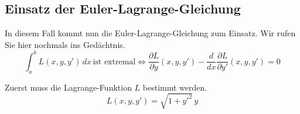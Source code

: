 \subsection{Einsatz der Euler-Lagrange-Gleichung
\label{kettenlinie:subsection:Einsatz der Euler-Lagrange-Gleichung}}
In diesem Fall kommt nun die Euler-Lagrange-Gleichung zum Einsatz. Wir rufen Sie hier nochmals ins Gedächtnis.
\begin{equation}
	\int_{a}^{b} L(x, y, y') \, dx \, \text{ist extremal} \iff \frac{\partial L}{\partial y}(x, y, y') - \frac{d}{dx} \frac{\partial L}{\partial y'}(x, y, y') = 0
\end{equation}

Zuerst muss die Lagrange-Funktion \(L\) bestimmt werden.
\begin{equation}
	L(x, y, y')
	=
	\sqrt{1 + y'^2} \, y
\end{equation}